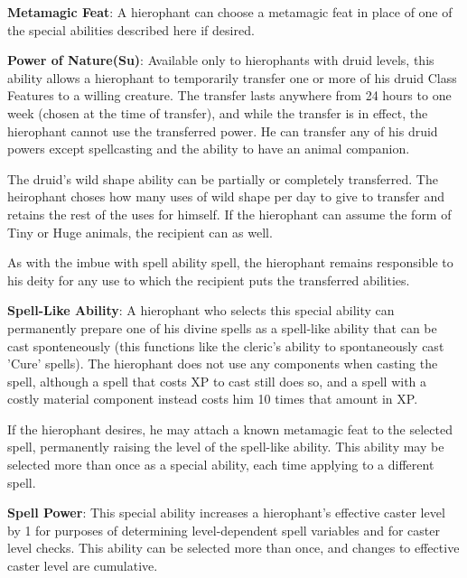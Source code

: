 \textbf{Metamagic Feat}: A hierophant can choose a metamagic feat in place of one of the special abilities described here if desired.

\textbf{Power of Nature(Su)}: Available only to hierophants with druid levels, this ability allows a hierophant to temporarily transfer one or more of his druid Class Features to a willing creature. The transfer lasts anywhere from 24 hours to one week (chosen at the time of transfer), and while the transfer is in effect, the hierophant cannot use the transferred power. He can transfer any of his druid powers except spellcasting and the ability to have an animal companion.

The druid’s wild shape ability can be partially or completely transferred. The heirophant choses how many uses of wild shape per day to give to transfer and retains the rest of the uses for himself. If the hierophant can assume the form of Tiny or Huge animals, the recipient can as well.

As with the imbue with spell ability spell, the hierophant remains responsible to his deity for any use to which the recipient puts the transferred abilities.

\textbf{Spell-Like Ability}: A hierophant who selects this special ability can permanently prepare one of his divine spells as a spell-like ability that can be cast sponteneously (this functions like the cleric's ability to spontaneously cast 'Cure' spells). The hierophant does not use any components when casting the spell, although a spell that costs XP to cast still does so, and a spell with a costly material component instead costs him 10 times that amount in XP.

If the hierophant desires, he may attach a known metamagic feat to the selected spell, permanently raising the level of the spell-like ability. This ability may be selected more than once as a special ability, each time applying to a different spell.

\textbf{Spell Power}: This special ability increases a hierophant’s effective caster level by 1 for purposes of determining level-dependent spell variables and for caster level checks. This ability can be selected more than once, and changes to effective caster level are cumulative.